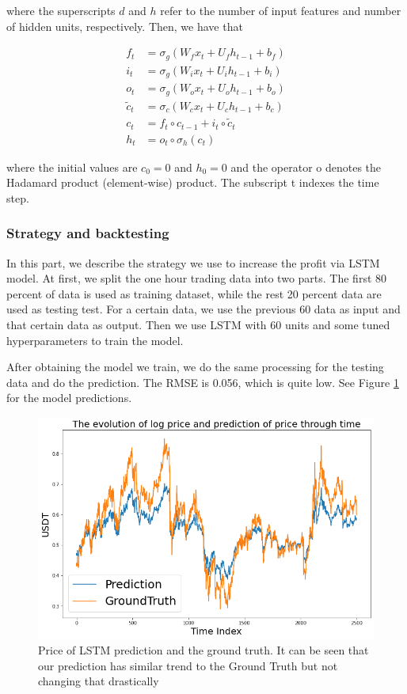 \documentclass[twoside]{report}
\begin{document}
\begin{spacing}{1}
where the superscripts $d$ and $h$ refer to the number of input features and number of hidden units, respectively. Then, we have that

$$
\begin{aligned}
f_{t} &=\sigma_{g}\left(W_{f} x_{t}+U_{f} h_{t-1}+b_{f}\right) \\
i_{t} &=\sigma_{g}\left(W_{i} x_{t}+U_{i} h_{t-1}+b_{i}\right) \\
o_{t} &=\sigma_{g}\left(W_{o} x_{t}+U_{o} h_{t-1}+b_{o}\right) \\
\tilde{c}_{t} &=\sigma_{c}\left(W_{c} x_{t}+U_{c} h_{t-1}+b_{c}\right) \\
c_{t} &=f_{t} \circ c_{t-1}+i_{t} \circ \tilde{c}_{t} \\
h_{t} &=o_{t} \circ \sigma_{h}\left(c_{t}\right)
\end{aligned}
$$

where the initial values are  $c_{0}=0$  and $h_{0}=0$  and the operator o denotes the Hadamard product (element-wise) product. The subscript  t indexes the time step. 

\subsubsection{Strategy and backtesting}
In this part, we describe the strategy we use to increase the profit via LSTM model. At first, we split the one hour trading data into two parts. The first 80 percent of data is used as training dataset, while the rest 20 percent data are used as testing test. For a certain data, we use the previous 60 data as input and that certain data as output. Then we use LSTM with 60 units and some tuned hyperparameters to train the model.

After obtaining the model we train, we do the same processing for the testing data and do the prediction. The RMSE is 0.056, which is quite low. See Figure \ref{fig:LSTM price} for the model predictions.


\begin{figure}[!htbp]
    \centering
    \includegraphics[scale = 0.5]{Images/LSTM price.png}
    \caption{Price of LSTM prediction and the ground truth. It can be seen that our prediction has similar trend to the Ground Truth but not changing that drastically}
    \label{fig:LSTM price}
\end{figure}





\end{spacing}
\end{document}
